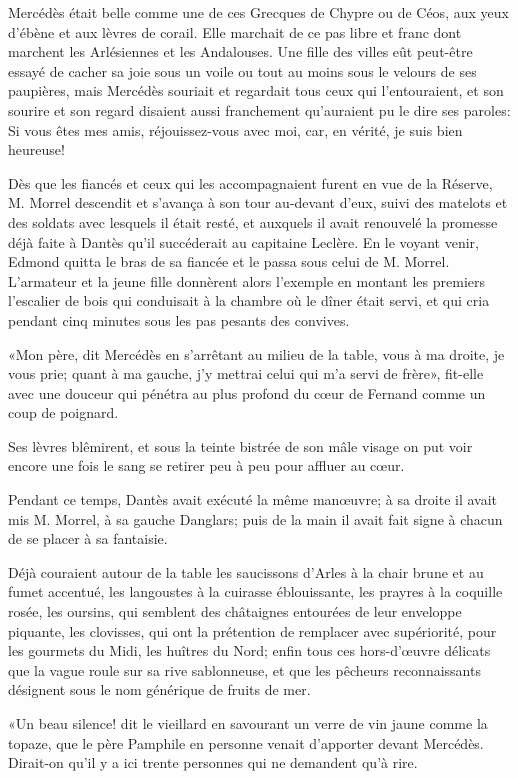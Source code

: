 Mercédès était belle comme une de ces Grecques de Chypre ou de Céos, aux yeux d'ébène et aux lèvres de corail. Elle marchait de ce pas libre et franc dont marchent les Arlésiennes et les Andalouses. Une fille des villes eût peut-être essayé de cacher sa joie sous un voile ou tout au moins sous le velours de ses paupières, mais Mercédès souriait et regardait tous ceux qui l'entouraient, et son sourire et son regard disaient aussi franchement qu'auraient pu le dire ses paroles: Si vous êtes mes amis, réjouissez-vous avec moi, car, en vérité, je suis bien heureuse!

Dès que les fiancés et ceux qui les accompagnaient furent en vue de la Réserve, M. Morrel descendit et s'avança à son tour au-devant d'eux, suivi des matelots et des soldats avec lesquels il était resté, et auxquels il avait renouvelé la promesse déjà faite à Dantès qu'il succéderait au capitaine Leclère. En le voyant venir, Edmond quitta le bras de sa fiancée et le passa sous celui de M. Morrel. L'armateur et la jeune fille donnèrent alors l'exemple en montant les premiers l'escalier de bois qui conduisait à la chambre où le dîner était servi, et qui cria pendant cinq minutes sous les pas pesants des convives.

«Mon père, dit Mercédès en s'arrêtant au milieu de la table, vous à ma droite, je vous prie; quant à ma gauche, j'y mettrai celui qui m'a servi de frère», fit-elle avec une douceur qui pénétra au plus profond du cœur de Fernand comme un coup de poignard.

Ses lèvres blêmirent, et sous la teinte bistrée de son mâle visage on put voir encore une fois le sang se retirer peu à peu pour affluer au cœur.

Pendant ce temps, Dantès avait exécuté la même manœuvre; à sa droite il avait mis M. Morrel, à sa gauche Danglars; puis de la main il avait fait signe à chacun de se placer à sa fantaisie.

Déjà couraient autour de la table les saucissons d'Arles à la chair brune et au fumet accentué, les langoustes à la cuirasse éblouissante, les prayres à la coquille rosée, les oursins, qui semblent des châtaignes entourées de leur enveloppe piquante, les clovisses, qui ont la prétention de remplacer avec supériorité, pour les gourmets du Midi, les huîtres du Nord; enfin tous ces hors-d'œuvre délicats que la vague roule sur sa rive sablonneuse, et que les pêcheurs reconnaissants désignent sous le nom générique de fruits de mer.

«Un beau silence! dit le vieillard en savourant un verre de vin jaune comme la topaze, que le père Pamphile en personne venait d'apporter devant Mercédès. Dirait-on qu'il y a ici trente personnes qui ne demandent qu'à rire.

